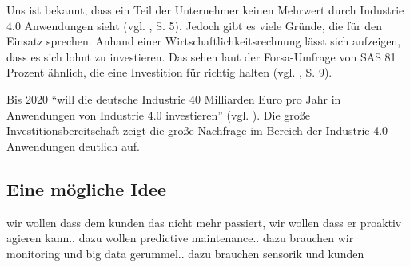 Uns ist bekannt, dass ein Teil der Unternehmer keinen Mehrwert durch Industrie 4.0 Anwendungen sieht (vgl. \cite{SasForsa}, S. 5). Jedoch gibt es viele Gründe, die für den Einsatz sprechen. Anhand einer Wirtschaftlichkeitsrechnung lässt sich aufzeigen, dass es sich lohnt zu investieren. Das sehen laut der Forsa-Umfrage von SAS 81 Prozent ähnlich, die eine Investition für richtig halten (vgl. \cite{SasForsa}, S. 9).

Bis 2020 "`will die deutsche Industrie 40 Milliarden Euro pro Jahr in Anwendungen von Industrie 4.0 investieren"' (vgl. \cite{IndustrieHohesPotenzial}). Die große Investitionsbereitschaft zeigt die große Nachfrage im Bereich der Industrie 4.0 Anwendungen deutlich auf. 

\subsection{Eine mögliche Idee}
wir wollen dass dem kunden das nicht mehr passiert, wir wollen dass er proaktiv agieren kann.. dazu wollen predictive maintenance.. dazu brauchen wir monitoring und big data gerummel..  dazu brauchen sensorik und kunden




